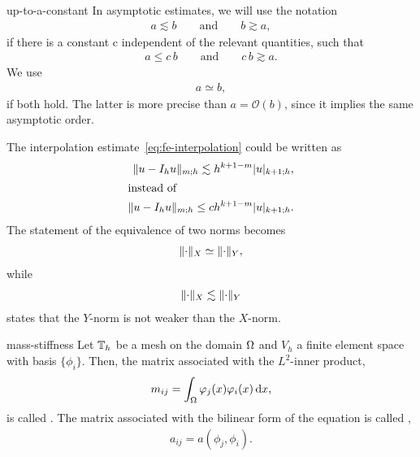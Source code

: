 \begin{Notation}{up-to-a-constant}
  In asymptotic estimates, we will use the notation
  \begin{gather*}
    a \lesssim b \qquad\text{and}\qquad b \gtrsim a,
  \end{gather*}
  if there is a constant c independent of the relevant quantities, such that
  \begin{gather*}
    a \le c \,b\qquad\text{and}\qquad c\,b \gtrsim a.
  \end{gather*}
  We use
  \begin{gather*}
    a \simeq b,
  \end{gather*}
  if both hold. The latter is more precise than $a = \mathcal O(b)$,
  since it implies the same asymptotic order.
\end{Notation}

\begin{example}
  The interpolation estimate~\eqref{eq:fe-interpolation} could be written as
  \begin{align*}
    \lVert u-I_h u\rVert_{m;h} \lesssim h^{k+1-m} \lvert u\rvert_{k+1;h},\\
    \intertext{instead of}
    \lVert u-I_h u\rVert_{m;h} \le c h^{k+1-m} \lvert u\rvert_{k+1;h}.
  \end{align*}
  The statement of the equivalence of two norms becomes
  \begin{gather*}
    \lVert\cdot\rVert_X \simeq \lVert\cdot\rVert_Y,
  \end{gather*}
  while 
  \begin{gather*}
    \lVert\cdot\rVert_X \lesssim \lVert\cdot\rVert_Y
  \end{gather*}
  states that the $Y$-norm is not weaker than the $X$-norm.
\end{example}

\begin{Definition}{mass-stiffness}
  Let $\mathbb T_h$ be a mesh on the domain $\Omega$ and $V_h$ a finite
  element space with basis $\{\phi_i\}$. Then, the matrix associated
  with the $L^2$-inner product,
  \begin{gather*}
    m_{ij} = \int_\Omega \varphi_j(x) \varphi_i(x) \,\mathrm{d} x,
  \end{gather*}
  is called . The matrix associated with the
  bilinear form of the equation is called ,
  \begin{gather*}
    a_{ij} = a(\phi_j,\phi_i).
  \end{gather*}
\end{Definition}

